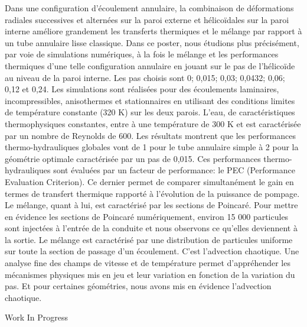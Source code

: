 {\normalsize
Dans une configuration d'écoulement annulaire, la combinaison de déformations radiales successives et alternées sur la paroi externe et hélicoïdales sur la paroi interne améliore grandement les transferts thermiques et le mélange par rapport à un tube annulaire lisse classique. Dans ce poster, nous étudions plus précisément, par voie de simulations numériques, à la fois le mélange et les performances thermiques d'une telle configuration annulaire en jouant sur le pas de l'hélicoïde au niveau de la paroi interne. Les pas choisis sont 0; 0,015; 0,03; 0,0432; 0,06; 0,12 et 0,24. Les simulations sont réalisées pour des écoulements laminaires, incompressibles, anisothermes et stationnaires en utilisant des conditions limites de température constante (320 K) sur les deux parois. L'eau, de caractéristiques thermophysiques constantes, entre à une température de 300 K et est caractérisée par un nombre de Reynolds de 600. Les résultats montrent que les performances thermo-hydrauliques globales vont de 1 pour le tube annulaire simple à 2 pour la géométrie optimale caractérisée par un pas de 0,015. Ces performances thermo-hydrauliques sont évaluées par un facteur de performance: le PEC (Performance Evaluation Criterion). Ce dernier permet de comparer simultanément le gain en termes de transfert thermique rapporté à l'évolution de la puissance de pompage. Le mélange, quant à lui, est caractérisé par les sections de Poincaré. Pour mettre en évidence les sections de Poincaré numériquement, environ 15 000 particules sont injectées à l'entrée de la conduite et nous observons ce qu'elles deviennent à la sortie. Le mélange est caractérisé par une distribution de particules uniforme sur toute la section de passage d'un écoulement. C'est l'advection chaotique. Une analyse fine des champs de vitesse et de température permet d'appréhender les mécanismes physiques mis en jeu et leur variation en fonction de la variation du pas. Et pour certaines géométries, nous avons mis en évidence l'advection chaotique.

 \vfill Work In Progress

}
 

